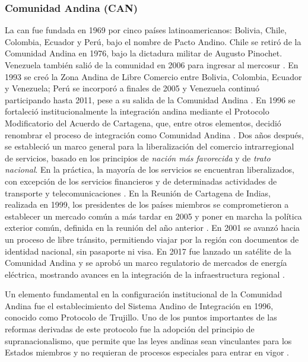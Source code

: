 \subsubsection{Comunidad Andina (CAN)}

La \gls{can} fue fundada en 1969 por cinco países latinoamericanos: Bolivia, Chile, Colombia, Ecuador y Perú, bajo el nombre de Pacto Andino. Chile se retiró de la Comunidad Andina en 1976, bajo la dictadura militar de Augusto Pinochet. Venezuela también salió de la comunidad en 2006 para ingresar al \gls{mercosur} \parencite[p.~223]{Sanchez2025}. En 1993 se creó la Zona Andina de Libre Comercio entre Bolivia, Colombia, Ecuador y Venezuela; Perú se incorporó a finales de 2005 y Venezuela continuó participando hasta 2011, pese a su salida de la Comunidad Andina \parencite{CAN_50anos}. En 1996 se fortaleció institucionalmente la integración andina mediante el Protocolo Modificatorio del Acuerdo de Cartagena, que, entre otros elementos, decidió renombrar el proceso de integración como Comunidad Andina \parencite{CAN_documentos}. Dos años después, se estableció un marco general para la liberalización del comercio intrarregional de servicios, basado en los principios de \textit{nación más favorecida} y de \textit{trato nacional}. En la práctica, la mayoría de los servicios se encuentran liberalizados, con excepción de los servicios financieros y de determinadas actividades de transporte y telecomunicaciones  \parencite{CAN_servicios}. En la Reunión de Cartagena de Indias, realizada en 1999, los presidentes de los países miembros se comprometieron a establecer un mercado común a más tardar en 2005 y poner en marcha la política exterior común, definida en la reunión del año anterior \parencite{CAN_documentos}. En 2001 se avanzó hacia un proceso de libre tránsito, permitiendo viajar por la región con documentos de identidad nacional, sin pasaporte ni visa. En 2017 fue lanzado un satélite de la Comunidad Andina y se aprobó un marco regulatorio de mercados de energía eléctrica, mostrando avances en la integración de la infraestructura regional \parencite{CAN}. 

Un elemento fundamental en la configuración institucional de la Comunidad Andina fue el establecimiento del Sistema Andino de Integración en 1996, conocido como Protocolo de Trujillo. Uno de los puntos importantes de las reformas derivadas de este protocolo fue la adopción del principio de supranacionalismo, que permite que las leyes andinas sean vinculantes para los Estados miembros y no requieran de procesos especiales para entrar en vigor \parencite[pp.~224--225]{Sanchez2025}.

